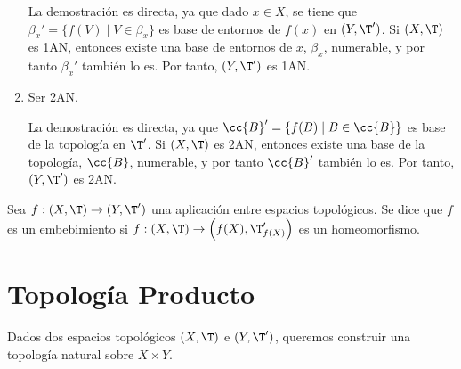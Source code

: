 \begin{ejemplo}
\begin{enumerate}
        La demostración es directa, ya que dado $x\in X$, se tiene que $\beta_x'=\{f(V)\mid V\in \beta_x\}$ es base de entornos de $f(x)$ en $(Y,\T')$.
        Si $(X,\T)$ es 1AN, entonces existe una base de entornos de $x$, $\beta_x$, numerable, y por tanto $\beta_x'$ también lo es. Por tanto, $(Y,\T')$ es 1AN.
        
        \item Ser 2AN.
        
        La demostración es directa, ya que $\cc{B}'=\{f(B)\mid B\in \cc{B}\}$ es base de la topología en $\T'$.
        Si $(X,\T)$ es 2AN, entonces existe una base de la topología, $\cc{B}$, numerable, y por tanto $\cc{B}'$ también lo es. Por tanto, $(Y,\T')$ es 2AN.
    \end{enumerate}
\end{ejemplo}

\begin{definicion}[Embebimiento]
    Sea $f:(X,\T)\to (Y,\T')$ una aplicación entre espacios topológicos. Se dice que $f$ es un embebimiento si $f:(X,\T)\to \left(f(X),\T'_{f(X)}\right)$ es un homeomorfismo.
\end{definicion}




\section{Topología Producto}\label{sec:TopProducto}
Dados dos espacios topológicos $(X,\T)$ e $(Y,\T')$, queremos construir una topología natural sobre $X\times Y$.


